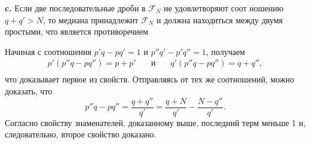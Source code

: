 \pagebreak

\textbf{c.} Если две последовательные дроби в $\mathcal{F}_N$ не удовлетворяют соот­\linebreak
ношению $q + q' > N$, то медиана принадлежит $\mathcal{F}_N$ и должна находиться\linebreak
между двумя простыми, что является противоречием

Начиная с соотношения $p'q - pq' = 1$ и $p''q' - p'q'' = 1$,  получаем
		$$\begin{array}{cccc}
				p'(p''q - pq'') = p + p' & \quad\text{и}\quad & q'(p{''}q - pq{''}) = q + q'',\\
		\end{array}$$
что доказывает первое из свойств. Отправляясь от тех же соотношений,\linebreak
можно доказать, что 
$$p''q - pq'' = \frac{q + q''}{q'} = \frac{q + N}{q'} - \frac{N - q''}{q'}.$$
\noindent Согласно свойству знаменателей, доказанному выше, последний терм\linebreak
меньше 1 и, следовательно, второе свойство доказано.

